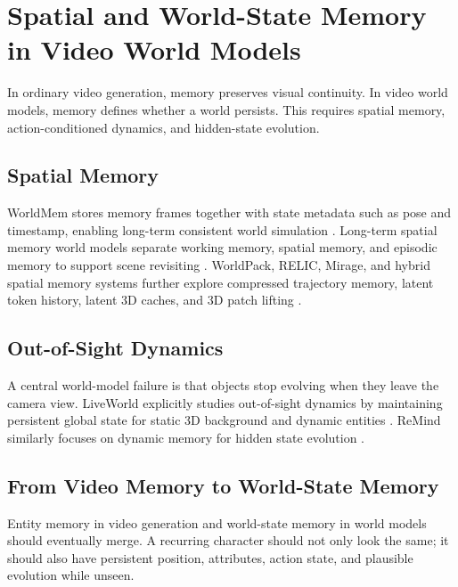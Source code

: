 \section{Spatial and World-State Memory in Video World Models}

In ordinary video generation, memory preserves visual continuity. In video world models, memory defines whether a world persists. This requires spatial memory, action-conditioned dynamics, and hidden-state evolution.

\subsection{Spatial Memory}
WorldMem stores memory frames together with state metadata such as pose and timestamp, enabling long-term consistent world simulation \citep{worldmem2025}. Long-term spatial memory world models separate working memory, spatial memory, and episodic memory to support scene revisiting \citep{spmem2025}. WorldPack, RELIC, Mirage, and hybrid spatial memory systems further explore compressed trajectory memory, latent token history, latent 3D caches, and 3D patch lifting \citep{worldpack2025,relic2025,mirage2026,mosaicmem2026}.

\subsection{Out-of-Sight Dynamics}
A central world-model failure is that objects stop evolving when they leave the camera view. LiveWorld explicitly studies out-of-sight dynamics by maintaining persistent global state for static 3D background and dynamic entities \citep{liveworld2026}. ReMind similarly focuses on dynamic memory for hidden state evolution \citep{remind2026}.

\subsection{From Video Memory to World-State Memory}
Entity memory in video generation and world-state memory in world models should eventually merge. A recurring character should not only look the same; it should also have persistent position, attributes, action state, and plausible evolution while unseen.
